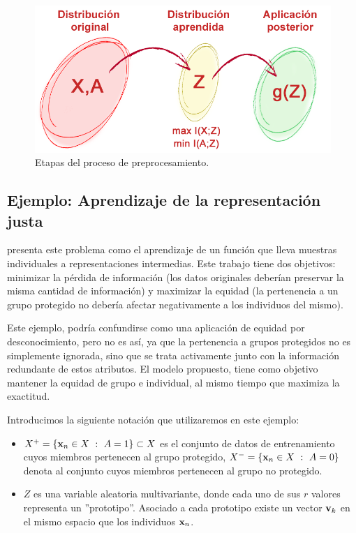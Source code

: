 \documentclass[oneside,openright,titlepage,numbers=noenddot,openany,headinclude,footinclude=true,
cleardoublepage=empty,abstractoff,BCOR=5mm,paper=a4,fontsize=12pt,main=spanish]{scrreprt}
\begin{document}
\begin{figure}[h]
	\centering
	\includegraphics[width=12.1cm]{preprocesado.png}
	\caption{Etapas del proceso de preprocesamiento.}
    \label{fig:preprocessing}
\end{figure}

\subsection{Ejemplo: Aprendizaje de la representación justa}

\cite{fairrepresentation2013} presenta  este problema como el aprendizaje de un función que lleva muestras individuales a representaciones intermedias. Este trabajo tiene dos objetivos: minimizar la pérdida de información (los datos originales deberían preservar la misma cantidad de información) y maximizar la equidad (la pertenencia a un grupo protegido no debería afectar negativamente a los individuos del mismo). 

Este ejemplo, podría confundirse como una aplicación de equidad por desconocimiento, pero no es así, ya que la pertenencia a grupos protegidos no es simplemente ignorada, sino que se trata activamente junto con la información redundante de estos atributos. El modelo propuesto, tiene como objetivo mantener la equidad de grupo e individual, al mismo tiempo que maximiza la exactitud.

\begin{notation}
Introducimos la siguiente notación que utilizaremos en este ejemplo:

\begin{itemize}
    \item $X^+=\{\nm{x}_n \in X \ : \ A=1\}\subset X$ es el conjunto de datos de entrenamiento cuyos miembros pertenecen al grupo protegido, $X^-=\{\textbf{x}_n \in X \ : \ A=0\}$ denota al conjunto cuyos miembros pertenecen al grupo no protegido.
    \item $Z$ es una variable aleatoria multivariante, donde cada uno de sus $r$ valores representa un ''prototipo''. Asociado a cada prototipo existe un vector $\textbf{v}_k$ en el mismo espacio que los individuos $\textbf{x}_n$.
\end{itemize}
\end{notation}
\end{document}
